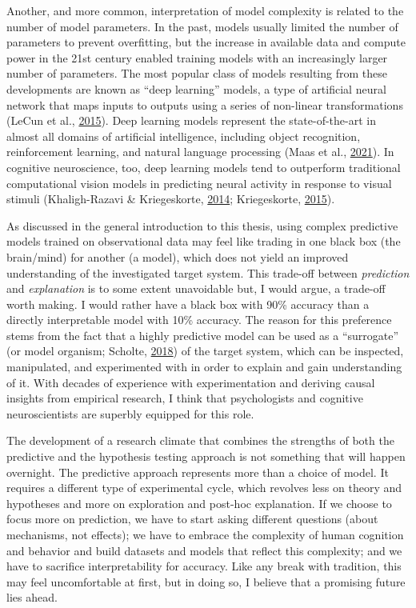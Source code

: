 \documentclass[12pt,american,a4paper,oneside,]{memoir} %
\begin{document}
Another, and more common, interpretation of model complexity is related to the number of model parameters. In the past, models usually limited the number of parameters to prevent overfitting, but the increase in available data and compute power in the 21st century enabled training models with an increasingly larger number of parameters. The most popular class of models resulting from these developments are known as ``deep learning'' models, a type of artificial neural network that maps inputs to outputs using a series of non-linear transformations (LeCun et al., \protect\hyperlink{ref-LeCun2015-xa}{2015}). Deep learning models represent the state-of-the-art in almost all domains of artificial intelligence, including object recognition, reinforcement learning, and natural language processing (Maas et al., \protect\hyperlink{ref-Van_der_Maas2021-rx}{2021}). In cognitive neuroscience, too, deep learning models tend to outperform traditional computational vision models in predicting neural activity in response to visual stimuli (Khaligh-Razavi \& Kriegeskorte, \protect\hyperlink{ref-khaligh2014deep}{2014}; Kriegeskorte, \protect\hyperlink{ref-Kriegeskorte2015-qi}{2015}).

As discussed in the general introduction to this thesis, using complex predictive models trained on observational data may feel like trading in one black box (the brain/mind) for another (a model), which does not yield an improved understanding of the investigated target system. This trade-off between \emph{prediction} and \emph{explanation} is to some extent unavoidable but, I would argue, a trade-off worth making. I would rather have a black box with 90\% accuracy than a directly interpretable model with 10\% accuracy. The reason for this preference stems from the fact that a highly predictive model can be used as a ``surrogate'' (or model organism; Scholte, \protect\hyperlink{ref-Scholte2018-he}{2018}) of the target system, which can be inspected, manipulated, and experimented with in order to explain and gain understanding of it. With decades of experience with experimentation and deriving causal insights from empirical research, I think that psychologists and cognitive neuroscientists are superbly equipped for this role.

The development of a research climate that combines the strengths of both the predictive and the hypothesis testing approach is not something that will happen overnight. The predictive approach represents more than a choice of model. It requires a different type of experimental cycle, which revolves less on theory and hypotheses and more on exploration and post-hoc explanation. If we choose to focus more on prediction, we have to start asking different questions (about mechanisms, not effects); we have to embrace the complexity of human cognition and behavior and build datasets and models that reflect this complexity; and we have to sacrifice interpretability for accuracy. Like any break with tradition, this may feel uncomfortable at first, but in doing so, I believe that a promising future lies ahead.
\end{document}
